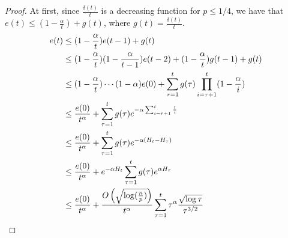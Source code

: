 \begin{proof}
  At first, since $\frac{\delta(t)}{t}$ is a decreasing function
  for $p \leq 1/4$, we have that
  $e(t)\leq (1-\frac{\alpha}{t}) + g(t)$, where $g(t)=\frac{\delta(t)}{t}$.
  \begin{align*}
    e(t)
    &\leq
    (1-\frac{\alpha}{t})e(t-1) + g(t)\\
    &\leq
    (1-\frac{\alpha}{t})(1-\frac{\alpha}{t-1})e(t-2)
    + (1-\frac{\alpha}{t})g(t-1) + g(t)\\
    &\leq
    (1-\frac{\alpha}{t})\cdots (1-\alpha)e(0)
    + \sum_{\tau=1}^t g(\tau)\prod_{i=\tau+1}^t(1-\frac{\alpha}{i})\\
    &\leq
    \frac{e(0)}{t^\alpha}
    + \sum_{\tau=1}^tg(\tau)e^{-\alpha\sum_{i=\tau+1}^t\frac{1}{i}}\\
    &\leq
    \frac{e(0)}{t^\alpha}
    + \sum_{\tau=1}^tg(\tau)e^{-\alpha(H_t-H_{\tau})}\\
    &\leq
    \frac{e(0)}{t^\alpha}
    + e^{-\alpha H_t}\sum_{\tau=1}^tg(\tau)e^{\alpha H_{\tau}}\\
    &\leq \frac{e(0)}{t^\alpha}
    + \frac{O\left(\sqrt{\log(\frac{n}{p})}\right)}{t^\alpha}
    \sum_{\tau=1}^t\tau^\alpha\frac{\sqrt{\log \tau}}{\tau^{3/2}}\\
  \end{align*}

\end{proof}

